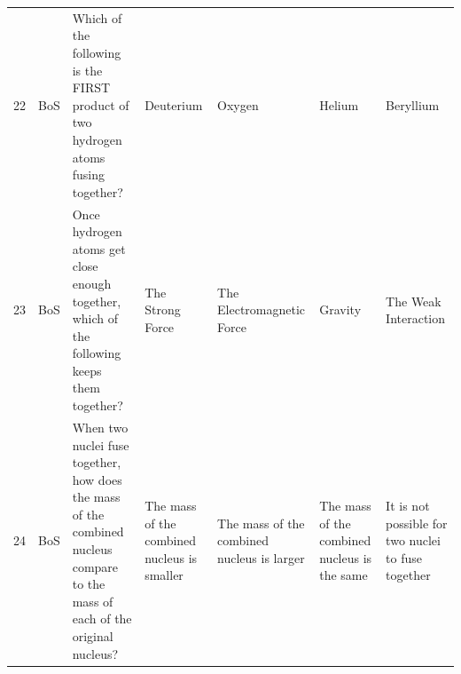 \documentclass[10pt]{article}
\begin{document}
\begin{tiny}
\begin{longtable}{r P{0.3in} P{1.203in} P{0.8in} P{0.8in} P{0.8in} P{0.8in}}
    22    &     BoS &                                                                                                                                                                                               Which of the following is the FIRST product of two hydrogen atoms fusing together? &                                                                                                                             Deuterium &                                                                                                Oxygen &                                                                                                                     Helium &                                                                                                                         Beryllium \\
    23    &     BoS &                                                                                                                                                                                       Once hydrogen atoms get close enough together, which of the following keeps them together? &                                                                                                                      The Strong Force &                                                                             The Electromagnetic Force &                                                                                                                    Gravity &                                                                                                              The Weak Interaction \\
    24    &     BoS &                                                                                                                                                    When two nuclei fuse together, how does the mass of the combined nucleus compare to the mass of each of the original nucleus? &                                                                                           The mass of the combined nucleus is smaller &                                                            The mass of the combined nucleus is larger &                                                                               The mass of the combined nucleus is the same &                                                                                It is not possible for two nuclei to fuse together \\

\end{longtable}
\end{tiny}
\end{document}
